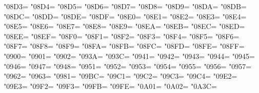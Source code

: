 \XeTeXcharclass"08D3=\KclassNum
\XeTeXcharclass"08D4=\KclassNum
\XeTeXcharclass"08D5=\KclassNum
\XeTeXcharclass"08D6=\KclassNum
\XeTeXcharclass"08D7=\KclassNum
\XeTeXcharclass"08D8=\KclassNum
\XeTeXcharclass"08D9=\KclassNum
\XeTeXcharclass"08DA=\KclassNum
\XeTeXcharclass"08DB=\KclassNum
\XeTeXcharclass"08DC=\KclassNum
\XeTeXcharclass"08DD=\KclassNum
\XeTeXcharclass"08DE=\KclassNum
\XeTeXcharclass"08DF=\KclassNum
\XeTeXcharclass"08E0=\KclassNum
\XeTeXcharclass"08E1=\KclassNum
\XeTeXcharclass"08E2=\KclassNum
\XeTeXcharclass"08E3=\KclassNum
\XeTeXcharclass"08E4=\KclassNum
\XeTeXcharclass"08E5=\KclassNum
\XeTeXcharclass"08E6=\KclassNum
\XeTeXcharclass"08E7=\KclassNum
\XeTeXcharclass"08E8=\KclassNum
\XeTeXcharclass"08E9=\KclassNum
\XeTeXcharclass"08EA=\KclassNum
\XeTeXcharclass"08EB=\KclassNum
\XeTeXcharclass"08EC=\KclassNum
\XeTeXcharclass"08ED=\KclassNum
\XeTeXcharclass"08EE=\KclassNum
\XeTeXcharclass"08EF=\KclassNum
\XeTeXcharclass"08F0=\KclassNum
\XeTeXcharclass"08F1=\KclassNum
\XeTeXcharclass"08F2=\KclassNum
\XeTeXcharclass"08F3=\KclassNum
\XeTeXcharclass"08F4=\KclassNum
\XeTeXcharclass"08F5=\KclassNum
\XeTeXcharclass"08F6=\KclassNum
\XeTeXcharclass"08F7=\KclassNum
\XeTeXcharclass"08F8=\KclassNum
\XeTeXcharclass"08F9=\KclassNum
\XeTeXcharclass"08FA=\KclassNum
\XeTeXcharclass"08FB=\KclassNum
\XeTeXcharclass"08FC=\KclassNum
\XeTeXcharclass"08FD=\KclassNum
\XeTeXcharclass"08FE=\KclassNum
\XeTeXcharclass"08FF=\KclassNum
\XeTeXcharclass"0900=\KclassNum
\XeTeXcharclass"0901=\KclassNum
\XeTeXcharclass"0902=\KclassNum
\XeTeXcharclass"093A=\KclassNum
\XeTeXcharclass"093C=\KclassNum
\XeTeXcharclass"0941=\KclassNum
\XeTeXcharclass"0942=\KclassNum
\XeTeXcharclass"0943=\KclassNum
\XeTeXcharclass"0944=\KclassNum
\XeTeXcharclass"0945=\KclassNum
\XeTeXcharclass"0946=\KclassNum
\XeTeXcharclass"0947=\KclassNum
\XeTeXcharclass"0948=\KclassNum
\XeTeXcharclass"0951=\KclassNum
\XeTeXcharclass"0952=\KclassNum
\XeTeXcharclass"0953=\KclassNum
\XeTeXcharclass"0954=\KclassNum
\XeTeXcharclass"0955=\KclassNum
\XeTeXcharclass"0956=\KclassNum
\XeTeXcharclass"0957=\KclassNum
\XeTeXcharclass"0962=\KclassNum
\XeTeXcharclass"0963=\KclassNum
\XeTeXcharclass"0981=\KclassNum
\XeTeXcharclass"09BC=\KclassNum
\XeTeXcharclass"09C1=\KclassNum
\XeTeXcharclass"09C2=\KclassNum
\XeTeXcharclass"09C3=\KclassNum
\XeTeXcharclass"09C4=\KclassNum
\XeTeXcharclass"09E2=\KclassNum
\XeTeXcharclass"09E3=\KclassNum
\XeTeXcharclass"09F2=\KclassNum
\XeTeXcharclass"09F3=\KclassNum
\XeTeXcharclass"09FB=\KclassNum
\XeTeXcharclass"09FE=\KclassNum
\XeTeXcharclass"0A01=\KclassNum
\XeTeXcharclass"0A02=\KclassNum
\XeTeXcharclass"0A3C=\KclassNum
